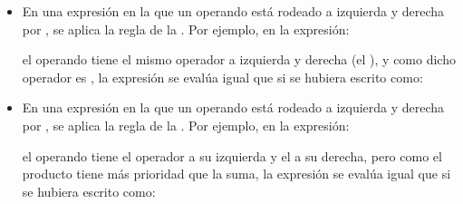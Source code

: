 \documentclass[a4paper,12pt,spanish]{sphinxmanual}
\begin{document}
\begin{itemize}
\item {} 
En una expresión en la que un operando está rodeado a izquierda y derecha por
, se aplica la regla de la . Por ejemplo,
en la expresión:

%
\begin{sphinxVerbatim}[commandchars=\\\{\}]
    
\end{sphinxVerbatim}

el operando  tiene el mismo operador a izquierda y derecha (el \sphinxcode{\sphinxupquote{+}}), y
como dicho operador es , la expresión se evalúa
igual que si se hubiera escrito como:

%
\begin{sphinxVerbatim}[commandchars=\\\{\}]
    
\end{sphinxVerbatim}

\item {} 
En una expresión en la que un operando está rodeado a izquierda y derecha por
, se aplica la regla de la . Por ejemplo,
en la expresión:

%
\begin{sphinxVerbatim}[commandchars=\\\{\}]
    
\end{sphinxVerbatim}

el operando  tiene el operador \sphinxcode{\sphinxupquote{+}} a su izquierda y el \sphinxcode{\sphinxupquote{*}} a su
derecha, pero como el producto tiene más prioridad que la suma, la expresión
se evalúa igual que si se hubiera escrito como:

%
\begin{sphinxVerbatim}[commandchars=\\\{\}]
    
\end{sphinxVerbatim}

\end{itemize}
\end{document}
